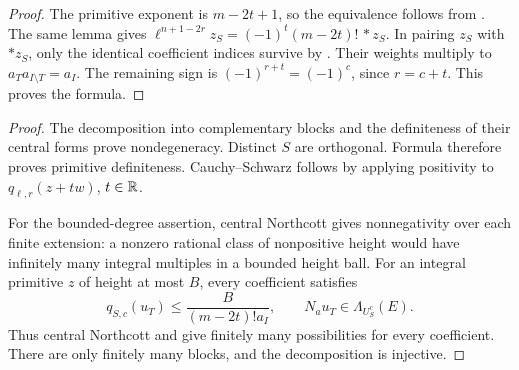\begin{proof}
The primitive exponent is \(m-2t+1\), so the equivalence follows
from . The same lemma gives
\(\ell^{n+1-2r}z_S=(-1)^t(m-2t)!\,*z_S\).
In pairing \(z_S\) with \(*z_S\), only the identical coefficient
indices survive by . Their weights
multiply to \(a_Ta_{I\setminus T}=a_I\). The remaining sign is
\((-1)^{r+t}=(-1)^c\), since \(r=c+t\). This proves the formula.
\end{proof}


\begin{proof}
The decomposition into complementary blocks and the definiteness
of their central forms prove nondegeneracy. Distinct \(S\) are
orthogonal. Formula  therefore
proves primitive definiteness. Cauchy--Schwarz follows by applying
positivity to \(q_{\ell,r}(z+tw)\), \(t\in\mathbb R\).

For the bounded-degree assertion, central Northcott gives
nonnegativity over each finite extension: a nonzero rational class
of nonpositive height would have infinitely many integral multiples
in a bounded height ball. For an integral primitive \(z\) of
height at most \(B\), every
coefficient satisfies
\[
 q_{S,c}(u_T)\le
   \frac{B}{(m-2t)!a_I},\qquad
 N_a u_T\in\Lambda_{U_S^c}(E).
\]
Thus central Northcott and 
give finitely many possibilities for every coefficient. There are
only finitely many blocks, and the decomposition is injective.
\end{proof}
